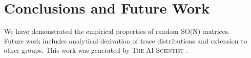 \documentclass{article}
\begin{document}
\section{Conclusions and Future Work}
\label{sec:conclusion}
We have demonstrated the empirical properties of random SO(N) matrices. Future work includes analytical derivation of trace distributions and extension to other groups.
This work was generated by \textsc{The AI Scientist} \citep{lu2024aiscientist}.


\end{document}
